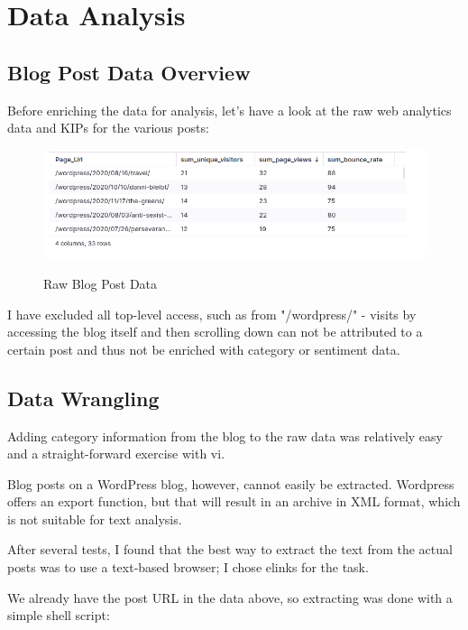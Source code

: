 %
%

\pagebreak
\section{Data Analysis}

\onehalfspacing

\subsection{Blog Post Data Overview}

Before enriching the data for analysis, let's have a look at the raw web analytics data and KIPs for the various posts:

\begin{figure}[H]
\centering
\caption {Raw Blog Post Data}
\includegraphics[width=\linewidth]{images/analysis-raw.png}
\label{fig:analysisRaw}
\end{figure}

I have excluded all top-level access, such as from "/wordpress/" - visits by accessing the blog itself and then scrolling down can not be attributed to a certain post and thus not be enriched with category or sentiment data.

\subsection{Data Wrangling}

Adding category information from the blog to the raw data was relatively easy and a straight-forward exercise with vi.

Blog posts on a WordPress blog, however, cannot easily be extracted. Wordpress offers an export function, but that will result in an archive in XML format, which is not suitable for text analysis.

After several tests, I found that the best way to extract the text from the actual posts was to use a text-based browser; I chose elinks for the task.

We already have the post URL in the data above, so extracting was done with a simple shell script:

